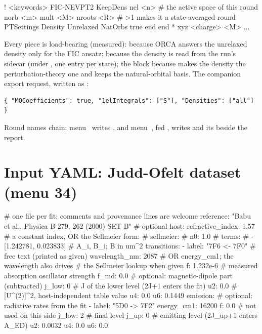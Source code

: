 \begin{codeblock}
! <keywords> FIC-NEVPT2 KeepDens
  nel <n>          # the active space of this round
  norb <m>
  mult <M>
  nroots <R>       # >1 makes it a state-averaged round
  PTSettings
    Density Unrelaxed
    NatOrbs true
  end
end
* xyz <charge> <M>
...
\end{codeblock}

Every piece is load-bearing (measured):  because ORCA answers
the unrelaxed density only for the FIC ansatz;  because the
density is read from the run's  sidecar (under
, one entry per state); the
 block because  makes the density the
perturbation-theory one and  keeps the natural-orbital
basis.  The companion export request, written as :

\begin{lstlisting}[style=fbkcode]
{ "MOCoefficients": true, "1elIntegrals": ["S"], "Densities": ["all"] }
\end{lstlisting}

Round names chain: menu~ writes , and
menu~, fed , writes 
and its  beside the report.

\section{Input YAML: Judd-Ofelt dataset (menu 34)}

\begin{codeblock}
# one file per fit; comments and provenance lines are welcome
reference: "Babu et al., Physica B 279, 262 (2000) SET B"   # optional
host:
  refractive_index: 1.57          # a constant index, OR the Sellmeier form:
  # sellmeier:
  #   n0: 1.0
  #   terms:
  #     - [1.242781, 0.023833]    # A_i, B_i; B in um^2
transitions:
  - label: "7F6 <- 7F0"           # free text (printed as given)
    wavelength_nm: 2087           # OR energy_cm1; the wavelength also drives
                                  # the Sellmeier lookup when given
    f: 1.232e-6                   # measured absorption oscillator strength
    f_md: 0.0                     # optional: magnetic-dipole part (subtracted)
    j_low: 0                      # J of the lower level (2J+1 enters the fit)
    u2: 0.0                       # [U^(2)]^2, host-independent table value
    u4: 0.0
    u6: 0.1449
emission:                         # optional: radiative rates from the fit
  - label: "5D0 -> 7F2"
    energy_cm1: 16200
    f: 0.0                        # not used on this side
    j_low: 2                      # final level
    j_up: 0                       # emitting level (2J_up+1 enters A_ED)
    u2: 0.0032
    u4: 0.0
    u6: 0.0
\end{codeblock}

